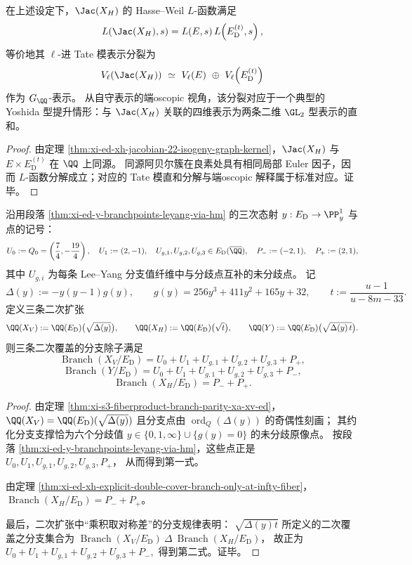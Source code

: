 \begin{corollary}\label{cor:xi-ed-xh-lfunction-tatemodule-endoscopic-splitting}
在上述设定下，\(\Jac(X_H)\) 的 Hasse--Weil \(L\)-函数满足
\[
L\!\left(\Jac(X_H),s\right)=L(E,s)\,L\!\left(E_{\mathrm D}^{(t)},s\right),
\]
等价地其 \(\ell\)-进 Tate 模表示分裂为
\[
V_\ell\!\left(\Jac(X_H)\right)\ \simeq\ V_\ell(E)\ \oplus\ V_\ell\!\left(E_{\mathrm D}^{(t)}\right)
\]
作为 \(G_{\QQ}\)-表示。
从自守表示的端oscopic 视角，该分裂对应于一个典型的 Yoshida 型提升情形：与 \(\Jac(X_H)\) 关联的四维表示为两条二维 \(\GL_2\) 型表示的直和。
\end{corollary}
\begin{proof}
由定理 \ref{thm:xi-ed-xh-jacobian-22-isogeny-graph-kernel}，\(\Jac(X_H)\) 与 \(E\times E_{\mathrm D}^{(t)}\) 在 \(\QQ\) 上同源。
同源阿贝尔簇在良素处具有相同局部 Euler 因子，因而 \(L\)-函数分解成立；对应的 Tate 模直和分解与端oscopic 解释属于标准对应。证毕。
\end{proof}

\begin{theorem}[三条二次子覆盖的分支除子之显式识别]\label{thm:xi-ed-three-quadratic-subcovers-explicit-branch-divisors}
沿用段落 \ref{thm:xi-ed-y-branchpoints-leyang-via-hm} 的三次态射 \(y:E_{\mathrm D}\to\PP^1_y\) 与点的记号：
\[
U_0:=Q_0=\left(\frac74,-\frac{19}{4}\right),\quad
U_1:=(2,-1),\quad
U_{g,1},U_{g,2},U_{g,3}\in E_{\mathrm D}(\overline\QQ),
\quad
P_-:=(-2,1),\quad P_+:=(2,1),
\]
其中 \(U_{g,i}\) 为每条 Lee--Yang 分支值纤维中与分歧点互补的未分歧点。
记
\[
\Delta(y):=-y(y-1)g(y),\qquad g(y)=256y^3+411y^2+165y+32,
\qquad
t:=\frac{u-1}{u-8m-33}.
\]
定义三条二次扩张
\[
\QQ(X_V):=\QQ(E_{\mathrm D})\bigl(\sqrt{\Delta(y)}\bigr),\qquad
\QQ(X_H):=\QQ(E_{\mathrm D})\bigl(\sqrt{t}\bigr),\qquad
\QQ(Y):=\QQ(E_{\mathrm D})\bigl(\sqrt{\Delta(y)\,t}\bigr).
\]
则三条二次覆盖的分支除子满足
\[
\operatorname{Branch}(X_V/E_{\mathrm D})
=U_0+U_1+U_{g,1}+U_{g,2}+U_{g,3}+P_+,
\]
\[
\operatorname{Branch}(Y/E_{\mathrm D})
=U_0+U_1+U_{g,1}+U_{g,2}+U_{g,3}+P_-,
\]
\[
\operatorname{Branch}(X_H/E_{\mathrm D})=P_-+P_+.
\]
\end{theorem}
\begin{proof}
由定理 \ref{thm:xi-s3-fiberproduct-branch-parity-xa-xv-ed}，
\(
\QQ(X_V)=\QQ(E_{\mathrm D})(\sqrt{\Delta(y)})
\)
且分支点由 \(\operatorname{ord}_Q(\Delta(y))\) 的奇偶性刻画；
其约化分支支撑恰为六个分歧值 \(y\in\{0,1,\infty\}\cup\{g(y)=0\}\) 的未分歧原像点。
按段落 \ref{thm:xi-ed-y-branchpoints-leyang-via-hm}，这些点正是
\(
U_0,U_1,U_{g,1},U_{g,2},U_{g,3},P_+
\)，
从而得到第一式。

由定理 \ref{thm:xi-ed-xh-explicit-double-cover-branch-only-at-infty-fiber}，
\(\operatorname{Branch}(X_H/E_{\mathrm D})=P_-+P_+\)。

最后，二次扩张中“乘积取对称差”的分支规律表明：
\(\sqrt{\Delta(y)t}\) 所定义的二次覆盖之分支集合为
\(\operatorname{Branch}(X_V/E_{\mathrm D})\ \Delta\ \operatorname{Branch}(X_H/E_{\mathrm D})\)，
故正为
\(
U_0+U_1+U_{g,1}+U_{g,2}+U_{g,3}+P_-,
\)
得到第二式。证毕。
\end{proof}

